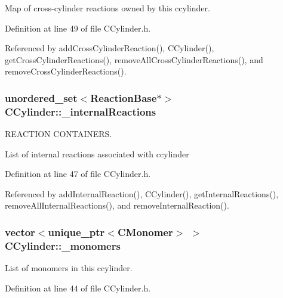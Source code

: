 Map of cross-\/cylinder reactions owned by this ccylinder. 



Definition at line 49 of file C\+Cylinder.\+h.



Referenced by add\+Cross\+Cylinder\+Reaction(), C\+Cylinder(), get\+Cross\+Cylinder\+Reactions(), remove\+All\+Cross\+Cylinder\+Reactions(), and remove\+Cross\+Cylinder\+Reactions().

\hypertarget{classCCylinder_a2f377a8697a4b4e053e747287e7a6a09}{
\subsubsection[{\+\_\+internal\+Reactions}]{\setlength{\rightskip}{0pt plus 5cm}unordered\+\_\+set$<${\bf Reaction\+Base}$\ast$$>$ C\+Cylinder\+::\+\_\+internal\+Reactions\hspace{0.3cm}{\ttfamily [private]}}}\label{classCCylinder_a2f377a8697a4b4e053e747287e7a6a09}


R\+E\+A\+C\+T\+I\+O\+N C\+O\+N\+T\+A\+I\+N\+E\+R\+S. 

List of internal reactions associated with ccylinder 

Definition at line 47 of file C\+Cylinder.\+h.



Referenced by add\+Internal\+Reaction(), C\+Cylinder(), get\+Internal\+Reactions(), remove\+All\+Internal\+Reactions(), and remove\+Internal\+Reaction().

\hypertarget{classCCylinder_a2583ee1b23a42501ece73a2a35d92a31}{
\subsubsection[{\+\_\+monomers}]{\setlength{\rightskip}{0pt plus 5cm}vector$<$unique\+\_\+ptr$<${\bf C\+Monomer}$>$ $>$ C\+Cylinder\+::\+\_\+monomers\hspace{0.3cm}{\ttfamily [private]}}}\label{classCCylinder_a2583ee1b23a42501ece73a2a35d92a31}


List of monomers in this ccylinder. 



Definition at line 44 of file C\+Cylinder.\+h.



